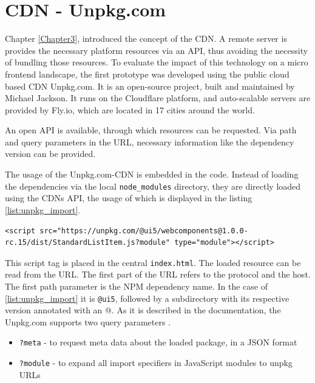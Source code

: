 \section{CDN - Unpkg.com} 

Chapter \ref{Chapter3}, introduced the concept of the CDN. A remote server is provides the necessary platform resources via an API, thus avoiding the necessity of bundling those resources.
To evaluate the impact of this technology on a micro frontend landscape, the first prototype was developed using the public cloud based CDN Unpkg.com. It is an open-source project, built and maintained by Michael Jackson. It runs on the Cloudflare platform, and auto-scalable servers are provided by Fly.io, which are located in 17 cities around the world.\cite{unpkg_doc}

An open API is available, through which resources can be requested. Via path and query parameters in the URL, necessary information like the dependency version can be provided.

The usage of the Unpkg.com-CDN is embedded in the code. Instead of loading the dependencies via the local \texttt{node\_modules} directory, they are directly loaded using the CDNs API, the usage of which is displayed in the listing \ref{list:unpkg_import}.

\begin{lstlisting}[caption=Import of a dependecy using the unpkg API, label=list:unpkg_import]
	<script src="https://unpkg.com/@ui5/webcomponents@1.0.0-rc.15/dist/StandardListItem.js?module" type="module"></script>
\end{lstlisting}

This script tag is placed in the central \texttt{index.html}. The loaded resource can be read from the URL. The first part of the URL refers to the protocol and the host. The first path parameter is the NPM dependency name. In the case of \ref{list:unpkg_import} it is \texttt{@ui5}, followed by a subdirectory with its respective version annotated with an @.
As it is described in the documentation, the Unpkg.com supports two query parameters \cite{unpkg_doc}.

\begin{itemize}[noitemsep]
	\item \texttt{?meta} - to request meta data about the loaded package, in a JSON format
	\item \texttt{?module} - to expand all import specifiers in JavaScript modules to unpkg URLs
\end{itemize}

